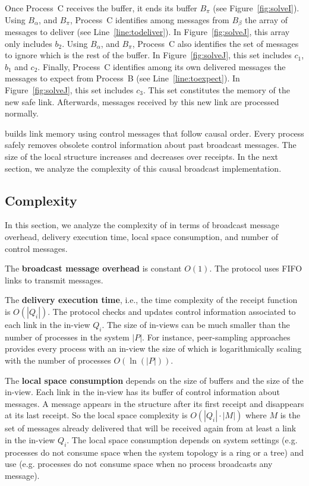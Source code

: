 \noindent Once Process~C receives the buffer, it ends its buffer $B_\pi$ (see
Figure~\ref{fig:solveI}). Using $B_\alpha$, and $B_\pi$, Process~C identifies
among messages from $B_\beta$ the array of messages to deliver (see
Line~\ref{line:todeliver}). In Figure~\ref{fig:solveJ}, this array only includes
$b_2$.  Using $B_\alpha$, and $B_\pi$, Process~C also identifies the set of
messages to ignore which is the rest of the buffer. In Figure~\ref{fig:solveJ},
this set includes $c_1$, $b_1$ and $c_2$. Finally, Process~C identifies among its own
delivered messages the messages to expect from Process~B (see
Line~\ref{line:toexpect}). In Figure~\ref{fig:solveJ}, this set includes $c_3$.
This set constitutes the memory of the new safe link.  Afterwards, messages
received by this new link are processed normally.


\RPCBROADCAST builds link memory using control messages that follow causal
order. Every process safely removes obsolete control information about past
broadcast messages.  The size of the local structure increases and decreases
over receipts.  In the next section, we analyze the complexity of this causal
broadcast implementation.

\subsection{Complexity}
\label{subsec:complexity}

In this section, we analyze the complexity of \RPCBROADCAST in terms of
broadcast message overhead, delivery execution time, local space consumption,
and number of control messages.

\noindent The \textbf{broadcast message overhead} is constant $O(1)$. The
protocol uses FIFO links to transmit messages.

\noindent The \textbf{delivery execution time}, i.e., the time complexity of the
receipt function is $O(|Q_i|)$.  The protocol checks and updates control
information associated to each link in the in-view $Q_i$. The size of in-views
can be much smaller than the number of processes in the system $|P|$. For
instance, peer-sampling approaches~\cite{ganesh2001scamp,nedelec2017adaptive}
provides every process with an in-view the size of which is logarithmically
scaling with the number of processes $O(\ln(|P|))$.

\noindent The \textbf{local space consumption} depends on the size of buffers
and the size of the in-view. Each link in the in-view has its buffer of control
information about messages. A message appears in the structure after its first
receipt and disappears at its last receipt. So the local space complexity is
$O(|Q_i| \cdot |M|)$ where $M$ is the set of messages already delivered that
will be received again from at least a link in the in-view $Q_i$. 
The local space consumption depends on system settings (e.g. processes do not
consume space when the system topology is a ring or a tree) and use
(e.g. processes do not consume space when no process broadcasts any message).

